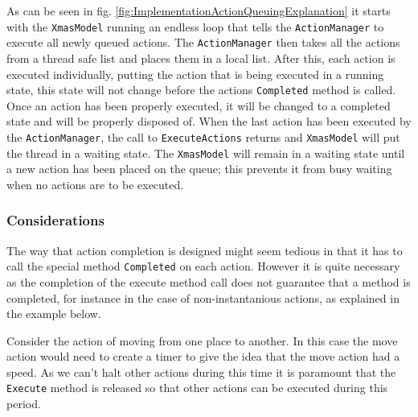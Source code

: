 As can be seen in fig. \ref{fig:ImplementationActionQueuingExplanation}
it starts with the \texttt{XmasModel} running an endless loop that
tells the \texttt{ActionManager} to execute all newly queued actions.
The \texttt{ActionManager} then takes all the actions from a thread
safe list and places them in a local list. After this, each action
is executed individually, putting the action that is being executed
in a running state, this state will not change before the actions
\texttt{Completed} method is called. Once an action has been properly
executed, it will be changed to a completed state and will be properly
disposed of. When the last action has been executed by the \texttt{ActionManager},
the call to \texttt{ExecuteActions} returns and \texttt{XmasModel}
will put the thread in a waiting state. The \texttt{XmasModel} will
remain in a waiting state until a new action has been placed on the
queue; this prevents it from busy waiting when no actions are to be
executed.


\subsubsection*{Considerations}

The way that action completion is designed might seem tedious in that
it has to call the special method \texttt{Completed} on each action.
However it is quite necessary as the completion of the execute method
call does not guarantee that a method is completed, for instance in
the case of non-instantanious actions, as explained in the example
below. 

Consider the action of moving from one place to another. In this case
the move action would need to create a timer to give the idea that
the move action had a speed. As we can\textquoteright{}t halt other
actions during this time it is paramount that the \texttt{Execute}
method is released so that other actions can be executed during this
period. 

